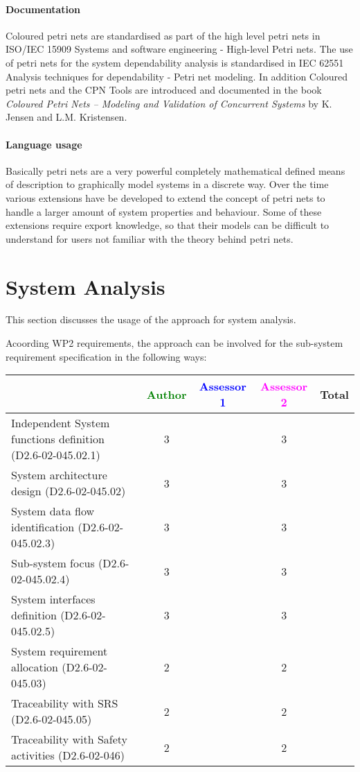 \paragraph{Documentation} Coloured petri nets are standardised as part of the high level petri nets in ISO/IEC 15909 Systems and software engineering - High-level Petri nets. The use of petri nets for the system dependability analysis is standardised in IEC 62551 Analysis techniques for dependability - Petri net modeling. In addition Coloured petri nets and the CPN Tools are introduced and documented in the book \textit{Coloured Petri Nets -- Modeling and Validation of Concurrent Systems} by K. Jensen and L.M. Kristensen. 

\paragraph{Language usage} Basically petri nets are a very powerful completely mathematical defined means of description to graphically model systems in a discrete way. Over the time various extensions have be developed to extend the concept of petri nets to handle a larger amount of system properties and  behaviour. Some of these extensions require export knowledge, so that their models can be difficult to understand for users not familiar with the theory behind petri nets.

\section{System Analysis}
This section discusses the usage of the approach for system analysis.

Acoording WP2 requirements, the approach can be involved for the sub-system requirement specification in the following ways:

\begin{tabular}{|l | c | c | c | c|}
\hline
& \textcolor{green}{Author} & \textcolor{blue}{Assessor 1} & \textcolor{magenta}{Assessor 2} & Total \\
\hline
Independent System functions definition (D2.6-02-045.02.1)  & 3    & & 3    &  \\
\hline 
System architecture design (D2.6-02-045.02) & 3    & & 3    &  \\
\hline
System data flow identification (D2.6-02-045.02.3)  & 3    & & 3    &  \\
\hline
Sub-system focus (D2.6-02-045.02.4)  & 3    & & 3    &  \\
\hline
System interfaces definition (D2.6-02-045.02.5)  & 3    & & 3    &  \\
\hline
System requirement allocation (D2.6-02-045.03)  & 2    & & 2    &  \\
\hline
Traceability with SRS (D2.6-02-045.05)  & 2    & & 2    &  \\
\hline
Traceability with Safety activities (D2.6-02-046)  & 2    & & 2    &  \\
\hline
\end{tabular}




